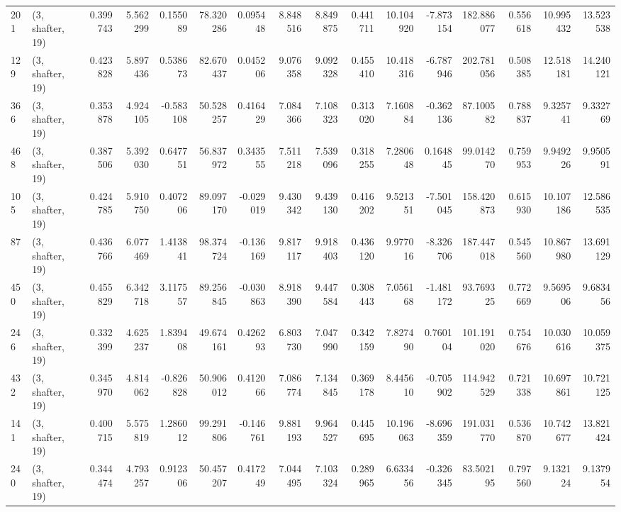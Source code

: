 \begin{tabular}{llrrrrrrrrrrrrrr}
201 &  (3, shafter, 19) &   0.399743 &   5.562299 &   0.155089 &    78.320286 &   0.095448 &   8.848516 &   8.849875 &  0.441711 &  10.104920 &  -7.873154 &   182.886077 &  0.556618 &  10.995432 &  13.523538 \\
129 &  (3, shafter, 19) &   0.423828 &   5.897436 &   0.538673 &    82.670437 &   0.045206 &   9.076358 &   9.092328 &  0.455410 &  10.418316 &  -6.787946 &   202.781056 &  0.508385 &  12.518181 &  14.240121 \\
366 &  (3, shafter, 19) &   0.353878 &   4.924105 &  -0.583108 &    50.528257 &   0.416429 &   7.084366 &   7.108323 &  0.313020 &   7.160884 &  -0.362136 &    87.100582 &  0.788837 &   9.325741 &   9.332769 \\
468 &  (3, shafter, 19) &   0.387506 &   5.392030 &   0.647751 &    56.837972 &   0.343555 &   7.511218 &   7.539096 &  0.318255 &   7.280648 &   0.164845 &    99.014270 &  0.759953 &   9.949226 &   9.950591 \\
105 &  (3, shafter, 19) &   0.424785 &   5.910750 &   0.407206 &    89.097170 &  -0.029019 &   9.430342 &   9.439130 &  0.416202 &   9.521351 &  -7.501045 &   158.420873 &  0.615930 &  10.107186 &  12.586535 \\
87  &  (3, shafter, 19) &   0.436766 &   6.077469 &   1.413841 &    98.374724 &  -0.136169 &   9.817117 &   9.918403 &  0.436120 &   9.977016 &  -8.326706 &   187.447018 &  0.545560 &  10.867980 &  13.691129 \\
450 &  (3, shafter, 19) &   0.455829 &   6.342718 &   3.117557 &    89.256845 &  -0.030863 &   8.918390 &   9.447584 &  0.308443 &   7.056168 &  -1.481172 &    93.769325 &  0.772669 &   9.569506 &   9.683456 \\
246 &  (3, shafter, 19) &   0.332399 &   4.625237 &   1.839408 &    49.674161 &   0.426293 &   6.803730 &   7.047990 &  0.342159 &   7.827490 &   0.760104 &   101.191020 &  0.754676 &  10.030616 &  10.059375 \\
432 &  (3, shafter, 19) &   0.345970 &   4.814062 &  -0.826828 &    50.906012 &   0.412066 &   7.086774 &   7.134845 &  0.369178 &   8.445610 &  -0.705902 &   114.942529 &  0.721338 &  10.697861 &  10.721125 \\
141 &  (3, shafter, 19) &   0.400715 &   5.575819 &   1.286012 &    99.291806 &  -0.146761 &   9.881193 &   9.964527 &  0.445695 &  10.196063 &  -8.696359 &   191.031770 &  0.536870 &  10.742677 &  13.821424 \\
240 &  (3, shafter, 19) &   0.344474 &   4.793257 &   0.912306 &    50.457207 &   0.417249 &   7.044495 &   7.103324 &  0.289965 &   6.633456 &  -0.326345 &    83.502195 &  0.797560 &   9.132124 &   9.137954 \\

\end{tabular}
